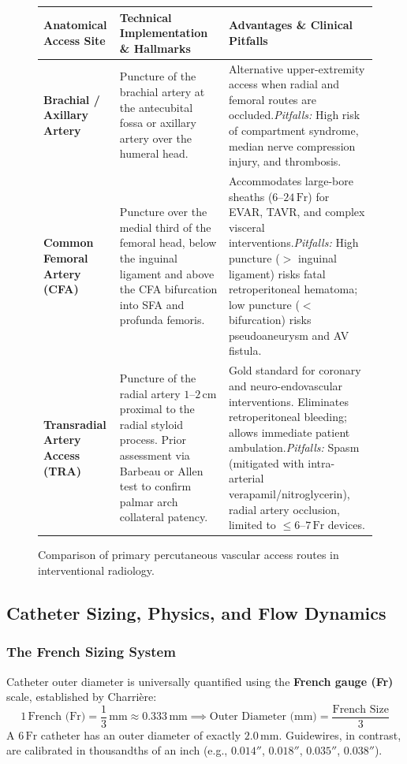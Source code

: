 \documentclass[11pt,a4paper]{article}
\begin{document}
\begin{figure}[htbp]
\centering
\setlength{\tabcolsep}{4pt}
\begin{tabular}{p{3.8cm}p{5.5cm}p{5.5cm}}
\toprule
\textbf{Anatomical Access Site} & \textbf{Technical Implementation \& Hallmarks} & \textbf{Advantages \& Clinical Pitfalls} \\
\midrule
\textbf{Brachial / Axillary Artery} & Puncture of the brachial artery at the antecubital fossa or axillary artery over the humeral head. & Alternative upper-extremity access when radial and femoral routes are occluded.\newline \textit{Pitfalls:} High risk of compartment syndrome, median nerve compression injury, and thrombosis. \\
\addlinespace
\textbf{Common Femoral Artery (CFA)} & Puncture over the medial third of the femoral head, below the inguinal ligament and above the CFA bifurcation into SFA and profunda femoris. & Accommodates large-bore sheaths ($6\text{--}24\,\text{Fr}$) for EVAR, TAVR, and complex visceral interventions.\newline \textit{Pitfalls:} High puncture ($>$ inguinal ligament) risks fatal retroperitoneal hematoma; low puncture ($<$ bifurcation) risks pseudoaneurysm and AV fistula. \\
\addlinespace
\textbf{Transradial Artery Access (TRA)} & Puncture of the radial artery $1\text{--}2\,\text{cm}$ proximal to the radial styloid process. Prior assessment via Barbeau or Allen test to confirm palmar arch collateral patency. & Gold standard for coronary and neuro-endovascular interventions. Eliminates retroperitoneal bleeding; allows immediate patient ambulation.\newline \textit{Pitfalls:} Spasm (mitigated with intra-arterial verapamil/nitroglycerin), radial artery occlusion, limited to $\le 6\text{--}7\,\text{Fr}$ devices. \\
\bottomrule
\end{tabular}
\caption{Comparison of primary percutaneous vascular access routes in interventional radiology.}
\label{tab:vascular_access}
\end{figure}

\subsection{Catheter Sizing, Physics, and Flow Dynamics}

\subsubsection{The French Sizing System}
Catheter outer diameter is universally quantified using the \textbf{French gauge (Fr)} scale, established by Charri\`{e}re:
\begin{equation}
    1\,\text{French (Fr)} = \frac{1}{3}\,\text{mm} \approx 0.333\,\text{mm} \implies \text{Outer Diameter (mm)} = \frac{\text{French Size}}{3}
\end{equation}
A $6\,\text{Fr}$ catheter has an outer diameter of exactly $2.0\,\text{mm}$. Guidewires, in contrast, are calibrated in thousandths of an inch (e.g., $0.014''$, $0.018''$, $0.035''$, $0.038''$).
\end{document}
